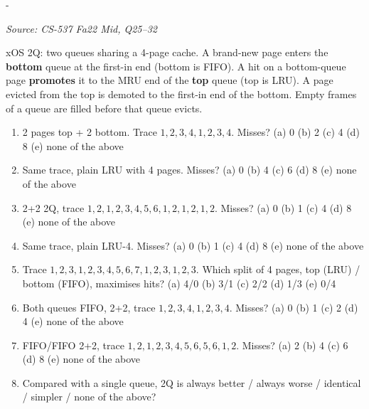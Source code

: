 \documentclass[11pt,a4paper]{article}
\makeatletter
\newcommand{\keepspace}[1]{\par\penalty-100\begingroup
  \setlength{\dimen@}{#1}\dimen@ii\pagegoal\advance\dimen@ii-\pagetotal
  \ifdim\dimen@>\dimen@ii\ifdim\dimen@ii>\z@\vfil\fi\break\fi\endgroup}
\newcounter{qn}[section]
\newenvironment{Qn}[4]{%
  \refstepcounter{qn}\keepspace{7\baselineskip}%
  \begin{tcolorbox}[qboxstyle, title={Q\thesection.\theqn\ \ [#1 \textbar\ #2]\ \ #4}]%
  {\footnotesize\color{g3}\textit{Source: #3}}\par\smallskip%
}{%
  \end{tcolorbox}%
}
\makeatother
\begin{document}
\begin{Qn}{Hard}{Lect 15}{CS-537 Fa22 Mid, Q25--32}{2Q: a FIFO filter in front of an LRU queue}
xOS 2Q: two queues sharing a 4-page cache. A brand-new page enters the
\textbf{bottom} queue at the first-in end (bottom is FIFO). A hit on a
bottom-queue page \textbf{promotes} it to the MRU end of the
\textbf{top} queue (top is LRU). A page evicted from the top is demoted
to the first-in end of the bottom. Empty frames of a queue are filled
before that queue evicts.
\begin{enumerate}
  \item[25.] 2 pages top + 2 bottom. Trace $1,2,3,4,1,2,3,4$. Misses?
        (a) 0 (b) 2 (c) 4 (d) 8 (e) none of the above
  \item[26.] Same trace, plain LRU with 4 pages. Misses?
        (a) 0 (b) 4 (c) 6 (d) 8 (e) none of the above
  \item[27.] 2+2 2Q, trace $1,2,1,2,3,4,5,6,1,2,1,2,1,2$. Misses?
        (a) 0 (b) 1 (c) 4 (d) 8 (e) none of the above
  \item[28.] Same trace, plain LRU-4. Misses?
        (a) 0 (b) 1 (c) 4 (d) 8 (e) none of the above
  \item[29.] Trace $1,2,3,1,2,3,4,5,6,7,1,2,3,1,2,3$. Which split of 4
        pages, top (LRU) / bottom (FIFO), maximises hits?
        (a) 4/0 (b) 3/1 (c) 2/2 (d) 1/3 (e) 0/4
  \item[30.] Both queues FIFO, 2+2, trace $1,2,3,4,1,2,3,4$. Misses?
        (a) 0 (b) 1 (c) 2 (d) 4 (e) none of the above
  \item[31.] FIFO/FIFO 2+2, trace $1,2,1,2,3,4,5,6,5,6,1,2$. Misses?
        (a) 2 (b) 4 (c) 6 (d) 8 (e) none of the above
  \item[32.] Compared with a single queue, 2Q is always better / always
        worse / identical / simpler / none of the above?
\end{enumerate}
\end{Qn}
\end{document}
